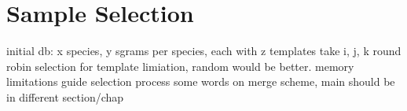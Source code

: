\section{Sample Selection}
initial db: x species, y sgrams per species, each with z templates
take i, j, k
round robin selection for template limiation, random would be better.
memory limitations guide selection process
some words on merge scheme, main should be in different section/chap
